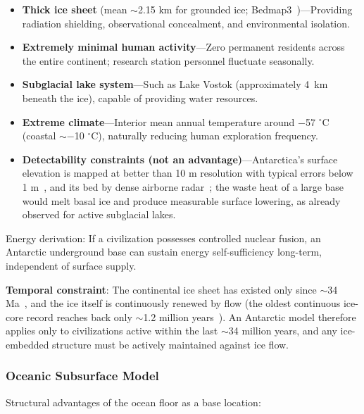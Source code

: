 \documentclass[aps,prd,twocolumn,superscriptaddress,nofootinbib]{revtex4-2}
\begin{document}
\begin{itemize}
  \item \textbf{Thick ice sheet} (mean ${\sim}$2.15 km for grounded ice; Bedmap3~\cite{Pritchard2025})---Providing radiation shielding, observational concealment, and environmental isolation.
  \item \textbf{Extremely minimal human activity}---Zero permanent residents across the entire continent; research station personnel fluctuate seasonally.
  \item \textbf{Subglacial lake system}---Such as Lake Vostok (approximately \SI{4}{km} beneath the ice), capable of providing water resources.
  \item \textbf{Extreme climate}---Interior mean annual temperature around $-$57 $^{\circ}$C (coastal ${\sim}-$10 $^{\circ}$C), naturally reducing human exploration frequency.
  \item \textbf{Detectability constraints (not an advantage)}---Antarctica's surface elevation is mapped at better than 10 m resolution with typical errors below 1 m~\cite{Howat2019}, and its bed by dense airborne radar~\cite{Pritchard2025}; the waste heat of a large base would melt basal ice and produce measurable surface lowering, as already observed for active subglacial lakes.
\end{itemize}

Energy derivation: If a civilization possesses controlled nuclear fusion, an Antarctic underground base can sustain energy self-sufficiency long-term, independent of surface supply.

\textbf{Temporal constraint}: The continental ice sheet has existed only since ${\sim}$34 Ma~\cite{DeConto2003}, and the ice itself is continuously renewed by flow (the oldest continuous ice-core record reaches back only ${\sim}$1.2 million years~\cite{StockholmU2025}). An Antarctic model therefore applies only to civilizations active within the last ${\sim}$34 million years, and any ice-embedded structure must be actively maintained against ice flow.

\subsubsection{Oceanic Subsurface Model}\label{sec:oceanic}

Structural advantages of the ocean floor as a base location:
\end{document}
